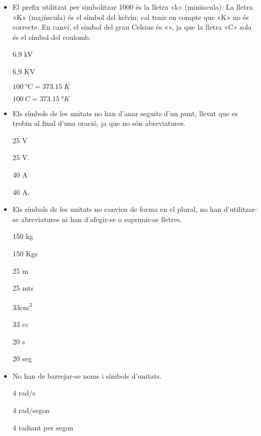 \begin{itemize}

\item El prefix utilitzat per simbolitzar 1000 és la lletra «k» (minúscula).  La lletra «K» (majúscula) és el símbol del  kelvin; cal tenir en compte que «\degree K»  no és correcte. En canvi, el símbol del grau Celsius és «\celsius», ja que la lletra «C» sola és el símbol del coulomb.

\textcolor{Green}\faCheckSquare{} 6,9  kV

\textcolor{Red}\faTimesCircle{} 6,9 KV

\textcolor{Green}\faCheckSquare{} $\SI{100}{\celsius} = \SI{373,15}{K}$

\textcolor{Red}\faTimesCircle{} $\SI{100}{C} = \SI{373,15}{\degree K}$

\item Els símbols de les unitats no han d'anar seguits d'un punt, llevat que es trobin al final d'una oració, ja que no són
abreviatures.

\textcolor{Green}\faCheckSquare{} 25 V

\textcolor{Red}\faTimesCircle{} 25 V.

\textcolor{Green}\faCheckSquare{}  40 A

\textcolor{Red}\faTimesCircle{}  40 A.


\item Els símbols de les unitats no canvien de forma en el plural, no han
d'utilitzar-se abreviatures ni han d'afegir-se o suprimir-se
lletres.

\textcolor{Green}\faCheckSquare{} 150 kg

\textcolor{Red}\faTimesCircle{} 150 Kgs

\textcolor{Green}\faCheckSquare{} 25 m

\textcolor{Red}\faTimesCircle{} 25 mts

\textcolor{Green}\faCheckSquare{} 33\unit{cm^3}

\textcolor{Red}\faTimesCircle{} 33 cc

\textcolor{Green}\faCheckSquare{} 20 s

\textcolor{Red}\faTimesCircle{} 20 seg


\item No han de barrejar-se noms i símbols d'unitats.

\textcolor{Green}\faCheckSquare{} 4 rad/s

\textcolor{Red}\faTimesCircle{} 4 rad/segon

\textcolor{Green}\faCheckSquare{} 4 radiant per segon


\end{itemize}
